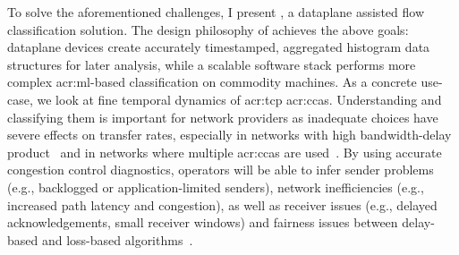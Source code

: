 To solve the aforementioned challenges, I present \seidr{}, a dataplane assisted flow classification solution.
The design philosophy of \seidr{} achieves the above goals: dataplane devices create accurately timestamped, aggregated histogram data structures for later analysis, while a scalable software stack performs more complex \gls{acr:ml}-based classification on commodity machines.
As a concrete use-case, we look at fine temporal dynamics of \gls{acr:tcp} \glspl{acr:cca}.
Understanding and classifying them is important for network providers as inadequate choices have severe effects on transfer rates, especially in networks with high bandwidth-delay product~\parencite{DBLP:journals/queue/CardwellCGYJ16} and in networks where multiple \glspl{acr:cca} are used~\parencite{DBLP:conf/imc/WareMSS19}. 
By using accurate congestion control diagnostics, operators will be able to infer sender problems (e.g., backlogged or application-limited senders), network inefficiencies (e.g., increased path latency and congestion), as well as receiver issues (e.g., delayed acknowledgements, small receiver windows) and fairness issues between delay-based and loss-based algorithms~\parencite{DBLP:conf/imc/WareMSS19}.


